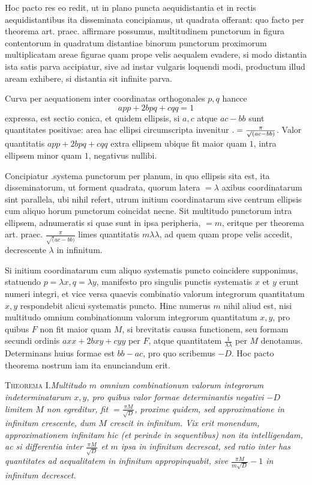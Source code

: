 Hoc pacto res eo redit, ut in plano puncta aequidistantia et in rectis aequidistantibus ita disseminata concipiamus, ut quadrata offerant: quo facto per theorema art. praec. affirmare possumus, multitudinem punctorum in figura contentorum in quadratum distantiae binorum punctorum proximorum multiplicatam areae figurae quam prope velis aequalem evadere, si modo distantia ista satis parva accipiatur, sive ad instar vulgaris loquendi modi, productum illud aream exhibere, si distantia sit infinite parva.

Curva per aequationem inter coordinatas orthogonales $p,q$ hancce
\[
app+2bpq+cqq=1
\]
expressa, est sectio conica, et quidem ellipsis, si $a,c$ atque $ac-bb$ sunt quantitates positivae: area hac ellipsi circumscripta invenitur $\mathbin{.}=\frac\pi{\surd(ac-bb)}$. Valor quantitatis $app+2bpq+cqq$ extra ellipsem ubique fit maior quam $1$, intra ellipsem minor quam $1$, negativus nullibi.

Concipiatur .systema punctorum per planum, in quo ellipsis sita est, ita disseminatorum, ut forment quadrata, quorum latera $=\lambda$ axibus coordinatarum sint parallela, ubi nihil refert, utrum initium coordinatarum sive centrum ellipsis cum aliquo horum punctorum coincidat necne. Sit multitudo punctorum intra ellipsem, adnumeratis si quae sunt in ipsa peripheria, $=m$, eritque per theorema art. praec. $\frac\pi{\surd(ac-bb)}$ limes quantitatis $m\lambda\lambda$, ad quem quam prope velis accedit, decrescente $\lambda$ in infinitum.

Si initium coordinatarum cum aliquo systematis puncto coincidere supponimus, statuendo $p=\lambda x,q=\lambda y$, manifesto pro singulis punctis systematis $x$ et $y$ erunt numeri integri, et vice versa quaevis combinatio valorum integrorum
%
quantitatum $x,y$ respondebit alicui systematis puncto. Hinc numerus $m$ nihil aliud est, nisi multitudo omnium combinationum valorum integrorum quantitatum $x,y$, pro quibus $F$ non fit maior quam $M$, si brevitatis caussa functionem, seu formam secundi ordinis $axx+2bxy+cyy$ per $F$, atque quantitatem $\frac1{\lambda\lambda}$ per $M$ denotamus. Determinans huius formae est $bb-ac$, pro quo scribemus $-D$. Hoc pacto theorema nostrum iam ita enunciandum erit.

\textsc{Theorema I.}\quad\emph{Multitudo $m$ omnium combinationum valorum integrorum indeterminatarum $x,y$, pro quibus valor formae determinantis negativi $-D$ limitem $M$ non egreditur, fit $=\frac{\pi M}{\surd D}$, proxime quidem, sed approximatione in infinitum crescente, dum $M$ crescit in infinitum. Vix erit monendum, approximationem infinitam hic (et perinde in sequentibus) non ita intelligendam, ac si differentia inter $\frac{\pi M}{\surd D}$ et $m$ ipsa in infinitum decrescat, sed ratio inter has quantitates ad aequalitatem in infinitum appropinquabit, sive $\frac{\pi M}{m\surd D}-1$ in infinitum decrescet.}

